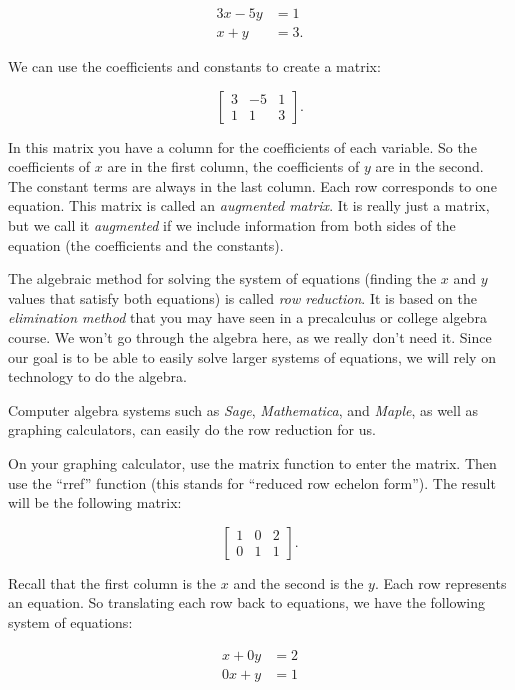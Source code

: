 \begin{align*}
3x-5y &=1\\
x+y &= 3.
\end{align*}

We can use the coefficients and constants to create a matrix:

\[
\left[
\begin{matrix}
3 & -5 & 1\\
1 & 1 & 3
\end{matrix}
\right].
\]

In this matrix you have a column for the coefficients of each variable. So the coefficients of $x$ are in the first column, the coefficients of $y$ are in the second. The constant terms are always in the last column. Each row corresponds to one equation.
This matrix is called an \emph{augmented matrix}. It is really just a matrix, but we call it \emph{augmented} if we include information from both sides of the equation (the coefficients and the constants).

The algebraic method for solving the system of equations (finding the $x$ and $y$ values that satisfy both equations) is called \emph{row reduction}. It is based on the \emph{elimination method} that you may have seen in a precalculus or college algebra course. We won't go through the algebra here, as we really don't need it. Since our goal is to be able to easily solve larger systems of equations, we will rely on technology to do the algebra. 

Computer algebra systems such as \textit{Sage}, \textit{Mathematica}, and \textit{Maple}, as well as graphing calculators, can easily do the row reduction for us. 

On your graphing calculator, use the matrix function to enter the matrix. Then use the ``rref'' function (this stands for ``reduced row echelon form'').  The result will be the following matrix:

\[
\left[
\begin{matrix}
1 & 0 & 2\\
0 & 1 & 1
\end{matrix}
\right].
\]

Recall that the first column is the $x$ and the second is the $y$. Each row represents an equation. So translating each row back to equations, we have the following system of equations:

\begin{align*}
x+0y &=2\\
0x+y &= 1
\end{align*}

